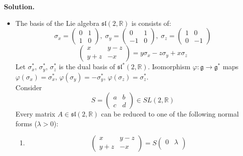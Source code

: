 \documentclass[12pt]{article}
\theoremstyle{definition}
\begin{document}
\begin{enumerate}
\begin{itemize}
\end{itemize}
\textbf{Solution.}
\begin{itemize}
    \item The basis of the Lie algebra $\mathfrak{sl}(2,\mathbb{R})$ is consists of:
    \begin{equation}
        \sigma_x=\begin{pmatrix}
        0 & 1 \\
        1 & 0
    \end{pmatrix},\;
    \sigma_y=
    \begin{pmatrix}
        0 & 1 \\
        -1 & 0
    \end{pmatrix},\;
    \sigma_z=
    \begin{pmatrix}
        1 & 0 \\
        0 & -1
    \end{pmatrix}
    \end{equation}
    \begin{equation}
        \begin{pmatrix}
            x & y-z \\
            y+z & -x
    \end{pmatrix}=y\sigma_x-z\sigma_y+x\sigma_z
    \end{equation}
    Let $\sigma^*_x$, $\sigma^*_y$, $\sigma^*_z$ is the dual basis of $\mathfrak{sl}^*(2,\mathbb{R})$. Isomorphism $\varphi:\mathfrak{g}\rightarrow\mathfrak{g}^*$ maps $\varphi(\sigma_x)=\sigma^*_x$, $\varphi(\sigma_y)=-\sigma^*_y$, $\varphi(\sigma_z)=\sigma^*_z$.\\
    Consider 
    \begin{equation}
        S=\begin{pmatrix}
            a & b \\
            c & d
        \end{pmatrix} \in SL(2,\mathbb{R})
    \end{equation}
    Every matrix $A \in \mathfrak{sl}(2, \mathbb{R})$ can be reduced to one of the following normal forms ($\lambda>0$):
    \begin{enumerate}
        \item
        \begin{equation}
            \begin{pmatrix}
            x & y-z \\
            y+z & -x
        \end{pmatrix}=
        S \begin{pmatrix}
            0 & \lambda \\

\end{pmatrix}
\end{equation}
\end{enumerate}
\end{itemize}
\end{enumerate}
\end{document}
